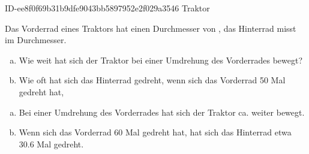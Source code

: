 \begin{exercise}
      {ID-ee8f0f69b31b9dfe9043bb5897952e2f029a3546}
      {Traktor}
  \ifproblem\problem\par
    Das Vorderrad eines Traktors hat einen Durchmesser von , das
    Hinterrad misst  im Durchmesser.
    \begin{enumerate}[a)]
      \item Wie weit hat sich der Traktor bei einer Umdrehung
            des Vorderrades bewegt?
      \item Wie oft hat sich das Hinterrad gedreht, wenn sich
            das Vorderrad \num{50} Mal gedreht hat,
    \end{enumerate}
  \fi
  \ifoutcome\outcome\par
    \begin{enumerate}[a)]
      \item Bei einer Umdrehung des Vorderrades hat sich der Traktor
            ca.  weiter bewegt.
      \item Wenn sich das Vorderrad \num{60} Mal gedreht hat, hat
            sich das Hinterrad etwa \num{30.6} Mal gedreht.
    \end{enumerate}
  \fi
\end{exercise}
